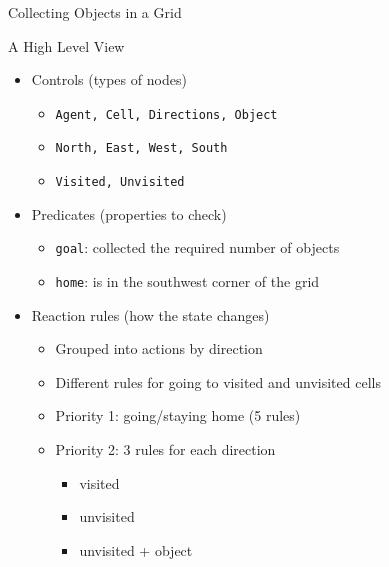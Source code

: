 \documentclass{beamer}
\begin{document}
\begin{frame}{Collecting Objects in a Grid}
\begin{figure}
  \end{figure}
\end{frame}

\begin{frame}{A High Level View}
  \begin{itemize}
  \item Controls (types of nodes)
    \pause
    \begin{itemize}
    \item \texttt{Agent, Cell, Directions, Object}
      \pause
    \item \texttt{North, East, West, South}
      \pause
    \item \texttt{Visited, Unvisited}
    \end{itemize}
    \pause
  \item Predicates (properties to check)
    \begin{itemize}
    \item \texttt{goal}: collected the required number of objects
    \item \texttt{home}: is in the southwest corner of the grid
    \end{itemize}
    \pause
  \item Reaction rules (how the state changes)
    \pause
    \begin{itemize}
    \item Grouped into \alert{actions} by direction
    \item Different rules for going to visited and unvisited cells
      \pause
    \item Priority 1: going/staying home (5 rules)
      \pause
    \item Priority 2: 3 rules for each direction
      \begin{itemize}
      \item visited
      \item unvisited
      \item unvisited + object
      \end{itemize}
    \end{itemize}
  \end{itemize}
\end{frame}
\end{document}

